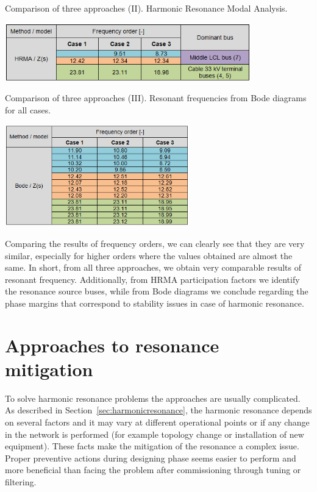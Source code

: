 \documentclass[a4paper,11pt,twoside]{report} %
\begin{document}
\begin{table}[htb]
	\centering
	\caption{Comparison of three approaches (II). Harmonic Resonance Modal Analysis.}
	\includegraphics[width=0.8\textwidth]{img/Case123/stability_comparison_table_hrma.png}
  	\label{tab:stability_comparison_table_hrma}
\end{table}
\FloatBarrier

\begin{table}[htb]
	\centering
	\caption{Comparison of three approaches (III). Resonant frequencies from Bode diagrams for all cases.}
	\includegraphics[width=0.6\textwidth]{img/Case123/stability_comparison_table_bode1.png}
  	\label{tab:stability_comparison_table_bode1}
\end{table}
\FloatBarrier

Comparing the results of frequency orders, we can clearly see that they are very similar, especially for higher orders where the values obtained are almost the same. In short, from all three approaches, we obtain very comparable results of resonant frequency. Additionally, from HRMA participation factors we identify the resonance source buses, while from Bode diagrams we conclude regarding the phase margins that correspond to stability issues in case of harmonic resonance.

\chapter{Approaches to resonance mitigation} \label{sec:mitigation}
To solve harmonic resonance problems the approaches are usually complicated. As described in Section~\ref{sec:harmonicresonance}, the harmonic resonance depends on several factors and it may vary at different operational points or if any change in the network is performed (for example topology change or installation of new equipment). These facts make the mitigation of the resonance a complex issue. Proper preventive actions during designing phase seems easier to perform and more beneficial than facing the problem after commissioning through tuning or filtering.
\end{document}
